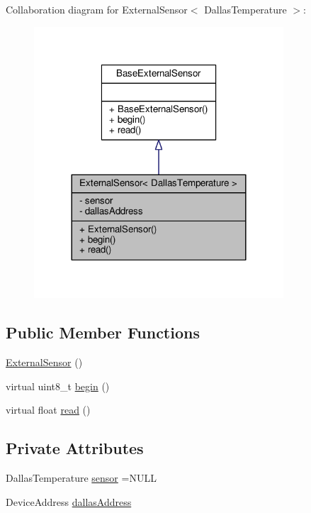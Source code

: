 Collaboration diagram for External\+Sensor$<$ Dallas\+Temperature $>$\+:
\nopagebreak
\begin{figure}[H]
\begin{center}
\leavevmode
\includegraphics[width=264pt]{classExternalSensor_3_01DallasTemperature_01_4__coll__graph}
\end{center}
\end{figure}
\subsection*{Public Member Functions}
\begin{DoxyCompactItemize}
\item 
\hyperlink{classExternalSensor_3_01DallasTemperature_01_4_ad290681e8780cdf1870416eee99d699d}{External\+Sensor} ()
\item 
virtual uint8\+\_\+t \hyperlink{classExternalSensor_3_01DallasTemperature_01_4_ac5275129b05e2ff8df45d5b222a661d9}{begin} ()
\item 
virtual float \hyperlink{classExternalSensor_3_01DallasTemperature_01_4_a1e725d9338314515d4e5dc456ed6a6c8}{read} ()
\end{DoxyCompactItemize}
\subsection*{Private Attributes}
\begin{DoxyCompactItemize}
\item 
Dallas\+Temperature \hyperlink{classExternalSensor_3_01DallasTemperature_01_4_adb6ba4fcdedef95ad8f6b0c9b6c0f9d1}{sensor} =N\+U\+LL
\item 
Device\+Address \hyperlink{classExternalSensor_3_01DallasTemperature_01_4_a7d9e9d2893e453638fcf440e5d8d9082}{dallas\+Address}
\end{DoxyCompactItemize}


